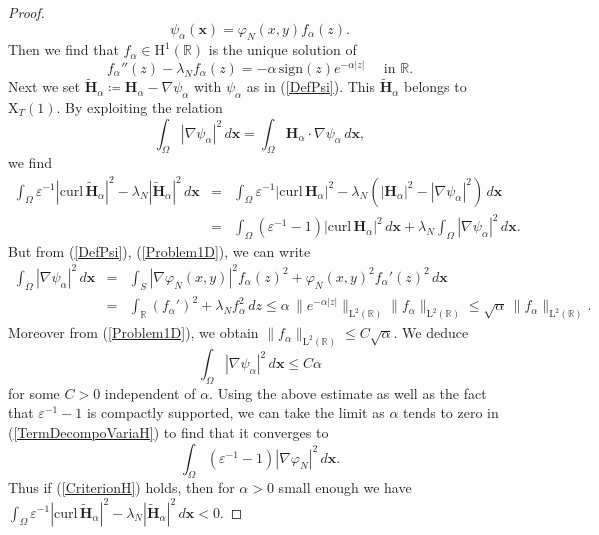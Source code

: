 \documentclass[11pt,a4paper]{article}
\newcommand{\dsp}{\displaystyle}
\newcommand{\eps}{\varepsilon}
\newcommand{\Om}{\Omega}
\newcommand{\mrm}[1]{\mathrm{#1}}
\newcommand{\bfx}{\boldsymbol{x}}
\newcommand{\R}{\mathbb{R}}
\newcommand{\mL}{\mrm{L}}
\newcommand{\mH}{\mrm{H}}
\newcommand{\mX}{\mrm{X}}
\newcommand{\curlvec}{\boldsymbol{\mrm{curl}}\,}
\def\H{\boldsymbol{H}}
\begin{document}
\begin{proof}
\begin{equation}\label{DefPsi}
\psi_\alpha(\bfx)=\varphi_N(x,y)f_\alpha(z).
\end{equation}
Then we find that $f_\alpha\in\mH^1(\R)$ is the unique solution of 
\begin{equation}\label{Problem1D}
f_\alpha''(z)-\lambda_N f_\alpha(z)=-\alpha\,\mrm{sign}(z)e^{-\alpha|z|}\quad\mbox{ in }\R.
\end{equation}
Next we set $\tilde{\H}_\alpha\coloneqq\H_\alpha-\nabla\psi_\alpha$ with $\psi_\alpha$ as in (\ref{DefPsi}). This $\tilde{\H}_\alpha$ belongs to $\boldsymbol{\mX}_T(1)$. By exploiting the relation 
\[
\int_\Om |\nabla\psi_\alpha|^2\,d\bfx=\int_\Om \H_\alpha\cdot\nabla\psi_\alpha\,d\bfx,
\]
we find
\begin{equation}\label{TermDecompoVariaH}
\begin{array}{rcl}
\dsp\int_\Om \eps^{-1}|\curlvec\tilde{\H}_\alpha|^2-\lambda_N |\tilde{\H}_\alpha|^2\,d\bfx &=&\dsp\int_\Om \eps^{-1}|\curlvec\H_\alpha|^2-\lambda_N(|\H_\alpha|^2-|\nabla\psi_\alpha|^2)\,d\bfx\\[10pt]
&=&\dsp\int_\Om (\eps^{-1}-1)|\curlvec\H_\alpha|^2\,d\bfx+\lambda_N\dsp\int_\Om |\nabla\psi_\alpha|^2\,d\bfx.
\end{array}
\end{equation}
But from (\ref{DefPsi}), (\ref{Problem1D}), we can write 
\[
\begin{array}{rcl}
\dsp\int_\Om |\nabla\psi_\alpha|^2\,d\bfx&=&\dsp\int_{S} |\nabla\varphi_N(x,y)|^2f_\alpha(z)^2+\varphi_N(x,y)^2f_\alpha'(z)^2\,d\bfx\\[10pt]
&=&\dsp\int_{\R} (f_\alpha')^2+\lambda_Nf_\alpha^2\,dz 
\le \dsp\alpha\,\|e^{-\alpha |z|}\|_{\mL^2(\R)}\|f_\alpha\|_{\mL^2(\R)}\le \sqrt{\alpha}\,\|f_\alpha\|_{\mL^2(\R)}.
\end{array}
\]
Moreover from (\ref{Problem1D}), we obtain $\|f_\alpha\|_{\mL^2(\R)}\le C\sqrt{\alpha}$. We deduce  
\[
\dsp\int_\Om |\nabla\psi_\alpha|^2\,d\bfx \le C\alpha
\]
for some $C>0$ independent of $\alpha$. Using the above estimate as well as the fact that $\eps^{-1}-1$ is compactly supported, we can take the limit as $\alpha$ tends to zero in (\ref{TermDecompoVariaH}) to find that it converges to 
\[
\dsp\int_\Om (\eps^{-1}-1)|\nabla\varphi_N|^2\,d\bfx.
\]
Thus if (\ref{CriterionH}) holds, then for $\alpha>0$ small enough  we have $\int_\Om \eps^{-1}|\curlvec\tilde{\H}_\alpha|^2-\lambda_N |\tilde{\H}_\alpha|^2\,d\bfx<0$. 
\end{proof}
\end{document}
